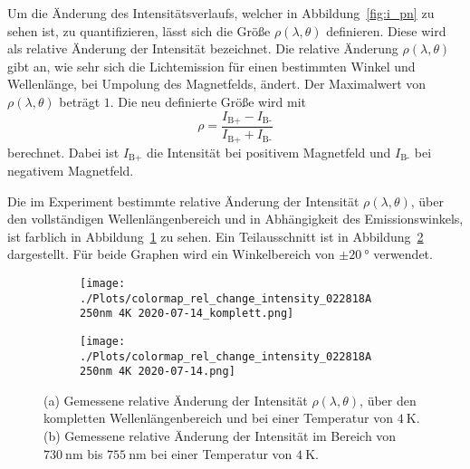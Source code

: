 Um die Änderung des Intensitätsverlaufs, welcher in Abbildung~\ref{fig:i_pn} zu sehen ist, zu quantifizieren,
lässt sich die Größe $\rho(\lambda,\theta)$ definieren. 
Diese wird als relative Änderung der Intensität bezeichnet.
Die relative Änderung $\rho(\lambda,\theta)$ gibt an, 
wie sehr sich die Lichtemission für einen bestimmten Winkel und Wellenlänge, bei Umpolung des Magnetfelds, ändert. 
Der Maximalwert von $\rho(\lambda,\theta)$ beträgt $1$.
Die neu definierte Größe wird mit 
\begin{equation}
    \rho = \frac{I_\text{B+} - I_\text{B-} }{ I_\text{B+} + I_\text{B-} }
\end{equation}
berechnet.
Dabei ist $I_\text{B+}$ die Intensität bei positivem Magnetfeld und $I_\text{B-}$ bei negativem Magnetfeld.

Die im Experiment bestimmte relative Änderung der Intensität $\rho(\lambda,\theta)$,
über den vollständigen Wellenlängenbereich und in Abhängigkeit des Emissionswinkels,
ist farblich in Abbildung~\ref{fig:rel_komplett} zu sehen.
Ein Teilausschnitt  ist in Abbildung~\ref{fig:rel} dargestellt.
Für beide Graphen wird ein Winkelbereich von $\pm \SI{20}{\degree}$ verwendet.
\begin{figure}
    \begin{subfigure}{0.50\textwidth}
        \texttt{[image: ./Plots/colormap\_rel\_change\_intensity\_022818A 250nm 4K 2020-07-14\_komplett.png]}
        \caption{}
        \label{fig:rel_komplett}
    \end{subfigure}
    \begin{subfigure}{0.50\textwidth}
        \texttt{[image: ./Plots/colormap\_rel\_change\_intensity\_022818A 250nm 4K 2020-07-14.png]}
        \caption{}
        \label{fig:rel}
    \end{subfigure}
    \caption{(a) Gemessene relative Änderung der Intensität $\rho(\lambda,\theta)$, über den kompletten Wellenlängenbereich und 
    bei einer Temperatur von $\SI{4}{\kelvin}$. (b) Gemessene relative Änderung der Intensität im Bereich
    von $\SI{730}{\nano\meter}$ bis $\SI{755}{\nano\meter}$ bei einer Temperatur von $\SI{4}{\kelvin}$.}
    \label{fig:rho}
\end{figure}
